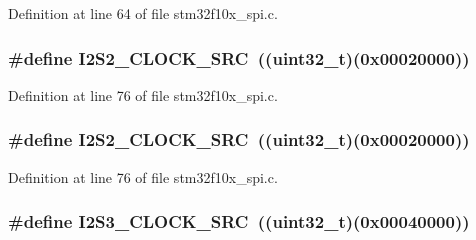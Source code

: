 Definition at line 64 of file stm32f10x\+\_\+spi.\+c.

\subsubsection[{\texorpdfstring{I2\+S2\+\_\+\+C\+L\+O\+C\+K\+\_\+\+S\+RC}{I2S2_CLOCK_SRC}}]{\setlength{\rightskip}{0pt plus 5cm}\#define I2\+S2\+\_\+\+C\+L\+O\+C\+K\+\_\+\+S\+RC~(({\bf uint32\+\_\+t})(0x00020000))}\hypertarget{group___s_p_i___private___defines_gae1190efd6dbcd06a9c03f4d499d28e4c}{}\label{group___s_p_i___private___defines_gae1190efd6dbcd06a9c03f4d499d28e4c}


Definition at line 76 of file stm32f10x\+\_\+spi.\+c.

\subsubsection[{\texorpdfstring{I2\+S2\+\_\+\+C\+L\+O\+C\+K\+\_\+\+S\+RC}{I2S2_CLOCK_SRC}}]{\setlength{\rightskip}{0pt plus 5cm}\#define I2\+S2\+\_\+\+C\+L\+O\+C\+K\+\_\+\+S\+RC~(({\bf uint32\+\_\+t})(0x00020000))}\hypertarget{group___s_p_i___private___defines_gae1190efd6dbcd06a9c03f4d499d28e4c}{}\label{group___s_p_i___private___defines_gae1190efd6dbcd06a9c03f4d499d28e4c}


Definition at line 76 of file stm32f10x\+\_\+spi.\+c.

\subsubsection[{\texorpdfstring{I2\+S3\+\_\+\+C\+L\+O\+C\+K\+\_\+\+S\+RC}{I2S3_CLOCK_SRC}}]{\setlength{\rightskip}{0pt plus 5cm}\#define I2\+S3\+\_\+\+C\+L\+O\+C\+K\+\_\+\+S\+RC~(({\bf uint32\+\_\+t})(0x00040000))}\hypertarget{group___s_p_i___private___defines_gabb67971448c15090f3372e3875db3d23}{}\label{group___s_p_i___private___defines_gabb67971448c15090f3372e3875db3d23}


